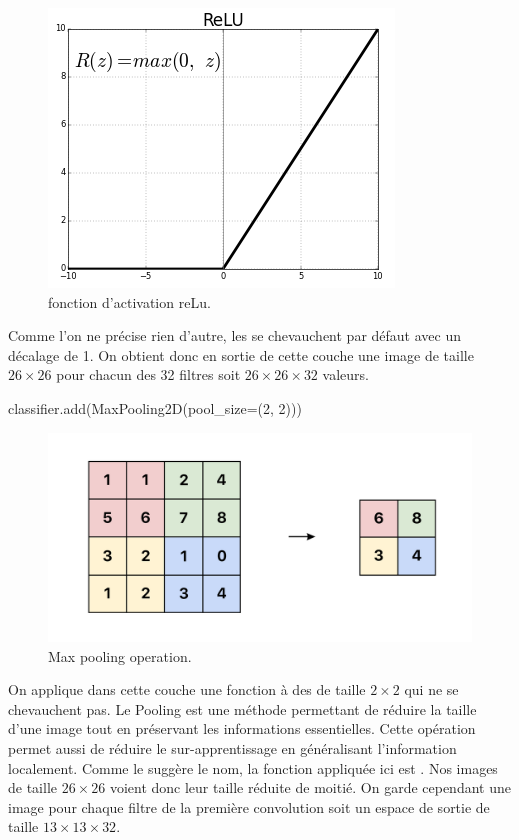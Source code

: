 \begin{figure}[h]
  \centering
  \includegraphics[scale=0.35]{assets/reLu}
  \caption{fonction d'activation reLu.}
  \label{fig:reLu}
\end{figure}

Comme l'on ne précise rien d'autre, les  se chevauchent par défaut avec un 
décalage de 1. 
On obtient donc en sortie de cette couche une image de taille $26 \times 26$ pour 
chacun des 32 filtres soit $26 \times 26 \times 32$ valeurs.

\begin{codeblock}
classifier.add(MaxPooling2D(pool_size=(2, 2)))
\end{codeblock}

\begin{figure}[h]
  \centering
  \includegraphics[scale=0.2]{assets/pooling}
  \caption{Max pooling operation.}
  \label{fig:pooling}
\end{figure}

On applique dans cette couche une fonction à des  de taille $2 \times 2$ 
qui ne se chevauchent pas. 
Le Pooling est une méthode permettant de réduire la taille d'une image tout en préservant 
les informations essentielles. Cette opération permet aussi de réduire le 
sur-apprentissage en généralisant l'information localement.
Comme le suggère le nom, la fonction appliquée ici est . 
Nos images de taille $26 \times 26$ voient donc leur taille réduite de moitié. 
On garde cependant une image pour chaque filtre de la première convolution 
soit un espace de sortie de taille $13 \times 13 \times 32$.

